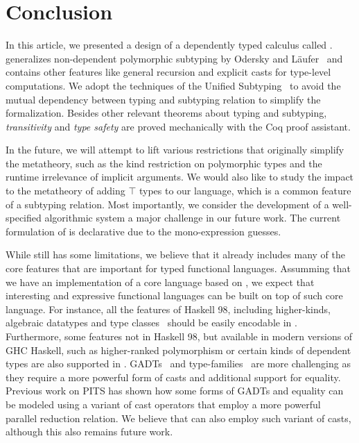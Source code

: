 \section{Conclusion}

In this article, we presented a design of a dependently typed calculus called \name.
\name generalizes non-dependent polymorphic subtyping by Odersky and
L\"aufer~\citep{odersky1996putting} and contains other features like general
recursion and explicit casts for type-level computations.
We adopt the techniques of the Unified Subtyping~\citep{full} to
avoid the mutual dependency between typing and subtyping relation to simplify
the formalization. Besides other relevant theorems about typing and subtyping,
\emph{transitivity} and \emph{type safety} are proved mechanically with the Coq
proof assistant.

In the future, we will attempt to lift various restrictions that originally simplify
the metatheory, such as the kind restriction on polymorphic
types and the runtime irrelevance of implicit arguments. We would also like to
study the impact to the metatheory of adding $\top$ types to our language,
which is a common feature of a subtyping relation.
Most importantly, we consider the development
of a well-specified algorithmic system a major challenge in our future
work. The current formulation of \name is declarative due to the mono-expression guesses.

While \name still has some limitations, we believe that it already includes many
of the core features that are important for typed functional languages.
Assumming that we have an implementation of a core language based on \name,
we expect that interesting and expressive functional languages can be built
on top of such core language. For instance, all the features of Haskell 98,
including higher-kinds, algebraic datatypes and type classes~\citep{typeclasseskaes,typeclasseswadler}
should be easily encodable
in \name. Furthermore, some features not in Haskell 98, but available in modern
versions of GHC Haskell, such as higher-ranked polymorphism or certain
kinds of dependent types are also supported in \name. GADTs~\citep{gadt1,gadt2} and
type-families~\citep{typefamilies} are more challenging as they require a more powerful
form of casts and additional support for equality. Previous work on PITS
has shown how some forms of GADTs and equality can be modeled using
a variant of cast operators that employ a more powerful parallel reduction
relation. We believe that \name can also employ such variant of casts,
although this also remains future work.
